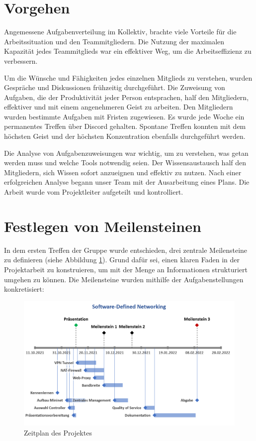\documentclass[fontsize=12pt,paper=a4,open=any,parskip=half,
  twoside=false,toc=listof,toc=bibliography,fleqn,leqno,
  captions=nooneline,captions=tableabove,british]{scrbook}
\begin{document}
\section{Vorgehen}
Angemessene Aufgabenverteilung im Kollektiv, brachte viele Vorteile für die Arbeitssituation und den Teammitgliedern. Die Nutzung der maximalen Kapazität jedes Teammitglieds war ein effektiver Weg, um die Arbeitseffizienz zu verbessern.\par
Um die Wünsche und Fähigkeiten jedes einzelnen Mitglieds zu verstehen, wurden Gespräche und Diskussionen frühzeitig durchgeführt. Die Zuweisung von Aufgaben, die der Produktivität jeder Person entsprachen, half den Mitgliedern, effektiver und mit einem angenehmeren Geist zu arbeiten. Den Mitgliedern wurden bestimmte Aufgaben mit Fristen zugewiesen. Es wurde jede Woche ein permanentes Treffen über Discord gehalten. Spontane Treffen konnten mit dem höchsten Geist und der höchsten Konzentration ebenfalls durchgeführt werden.\par
Die Analyse von Aufgabenzuweisungen war wichtig, um zu verstehen, was getan werden muss und welche Tools notwendig seien. Der Wissensaustausch half den Mitgliedern, sich Wissen sofort anzueignen und effektiv zu nutzen. Nach einer erfolgreichen Analyse begann unser Team mit der Ausarbeitung eines Plans. Die Arbeit wurde vom Projektleiter aufgeteilt und kontrolliert.

\section{Festlegen von Meilensteinen}
In dem ersten Treffen der Gruppe wurde entschieden, drei zentrale Meilensteine zu definieren (siehe Abbildung \ref{milestones}). Grund dafür sei, einen klaren Faden in der Projektarbeit zu konstruieren, um mit der Menge an Informationen strukturiert umgehen zu können. Die Meilensteine wurden mithilfe der Aufgabenstellungen konkretisiert:

\begin{figure}[htbp]
 \centering
 \includegraphics[width=1.0\textwidth]{Bilder/meilensteine}
 \captionsetup{justification=centering,margin=2cm}
 \caption{Zeitplan des Projektes}
 \label{milestones}
\end{figure}
\end{document}
